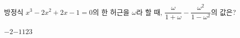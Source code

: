 방정식 $x^3-2x^2+2x-1=0$의 한 허근을 $\omega$라 할 때, $\dfrac{\omega}{1+\omega}-\dfrac{\omega^2}{1-\omega^2}$의 값은?
\begin{choices32}{$-2$}{$-1$}{$1$}{$2$}{$3$}\end{choices32}
